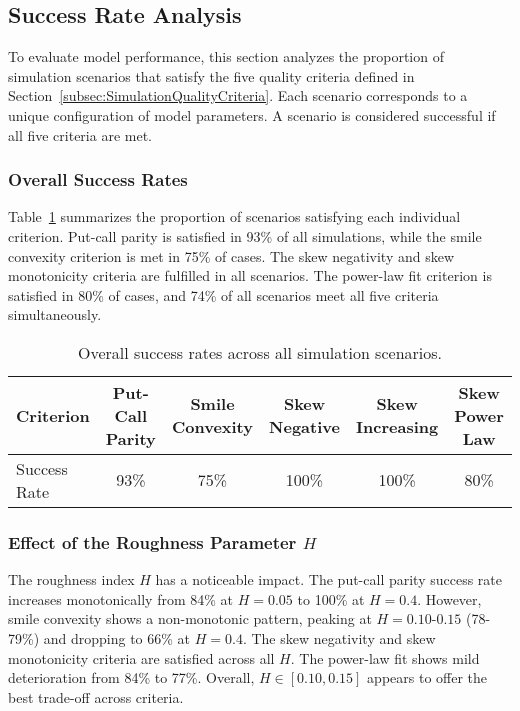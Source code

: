 \subsection{Success Rate Analysis} \label{subsec:SuccessRateAnalysis}

To evaluate model performance, this section analyzes the proportion of simulation scenarios that satisfy the five quality criteria defined in Section~\ref{subsec:SimulationQualityCriteria}. Each scenario corresponds to a unique configuration of model parameters. A scenario is considered successful if all five criteria are met.

\subsubsection*{Overall Success Rates}
Table~\ref{tab:OverallSuccessRates} summarizes the proportion of scenarios satisfying each individual criterion. Put-call parity is satisfied in 93\% of all simulations, while the smile convexity criterion is met in 75\% of cases. The skew negativity and skew monotonicity criteria are fulfilled in all scenarios. The power-law fit criterion is satisfied in 80\% of cases, and 74\% of all scenarios meet all five criteria simultaneously.

\begin{table}[h]
    \centering
    \small
    \begin{tabular}{lccccc}
        \toprule
        Criterion & Put-Call Parity & Smile Convexity & Skew Negative & Skew Increasing & Skew Power Law \\
        \midrule
        Success Rate & 93\% & 75\% & 100\% & 100\% & 80\% \\
        \bottomrule
    \end{tabular}
    \caption{Overall success rates across all simulation scenarios.}
    \label{tab:OverallSuccessRates}
\end{table}

\subsubsection*{Effect of the Roughness Parameter \texorpdfstring{$H$}{H}}
The roughness index $H$ has a noticeable impact. The put-call parity success rate increases monotonically from 84\% at $H = 0.05$ to 100\% at $H = 0.4$. However, smile convexity shows a non-monotonic pattern, peaking at $H = 0.10$-$0.15$ (78-79\%) and dropping to 66\% at $H = 0.4$. The skew negativity and skew monotonicity criteria are satisfied across all $H$. The power-law fit shows mild deterioration from 84\% to 77\%. Overall, $H \in [0.10, 0.15]$ appears to offer the best trade-off across criteria.

